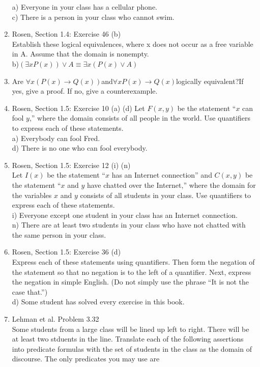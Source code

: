 \documentclass[12pt]{article}
\begin{document}
\begin{enumerate}
a) Everyone in your class has a cellular phone.\\
c) There is a person in your class who cannot swim.\\
\item Rosen, Section 1.4: Exercise 46 (b)\\
Establish these logical equivalences, where x does not occur as a free variable in A. Assume that the domain is nonempty.\\
b)$ (\exists x P(x))\lor A \equiv \exists x(P(x) \lor A)$\\
\item Are $\forall x(P(x)\to Q(x))$and$\forall xP(x)\to Q(x)$logically equivalent?If yes, give a proof. If no, give a counterexample.
\item Rosen, Section 1.5: Exercise 10 (a) (d)
Let $F(x, y)$ be the statement “$x$ can fool $y$,” where the domain consists of all people in the world. Use quantifiers to express each of these statements.\\
a) Everybody can fool Fred.\\ 
d) There is no one who can fool everybody.
\item Rosen, Section 1.5: Exercise 12 (i) (n)\\
Let $I(x)$ be the statement ``$x$ has an Internet connection'' and $C(x,y)$ be the statement ``$x$ and $y$ have chatted over the Internet,'' where the domain for the variables $x$ and $y$ consists of all students in your class. Use quantifiers to express each of these statements.\\
i) Everyone except one student in your class has an Internet connection.\\
n) There are at least two students in your class who have not chatted with the same person in your class.\\
\item Rosen, Section 1.5: Exercise 36 (d)\\
Express each of these statements using quantifiers. Then form the negation of the statement so that no negation is to the left of a quantifier. Next, express the negation in simple English. (Do not simply use the phrase ``It is not the case that.'')\\
d) Some student has solved every exercise in this book.
\item Lehman et al. Problem 3.32\\
Some students from a large class will be lined up left to right. There will be at least two stduents in the line. Translate each of the following assertions into predicate formulas with the set of students in the class as the domain of discourse. The only predicates you may use are

\end{enumerate}
\end{document}
